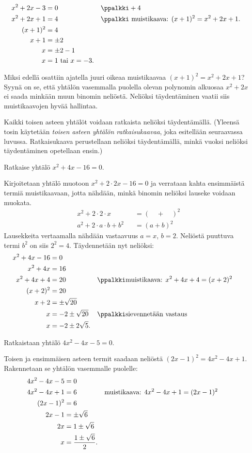 \begin{align*}
x^2+2x-3 & = 0  &&\ppalkki +4 \\
x^2+2x+1 & = 4  &&\ppalkki \text{ muistikaava: } (x+1)^2=x^2+2x+1. \\
(x+1)^2 & = 4 \\
x+1 & = \pm 2 \\
x & = \pm 2 - 1 \\
x & = 1 \text{ tai } x= -3. 
\end{align*}

Miksi edellä osattiin ajatella juuri oikeaa muistikaavaa $(x+1)^2=x^2+2x+1$?
Syynä on se, että yhtälön vasemmalla
puolella olevan polynomin alkuosaa $x^2+2x$ ei saada minkään muun
binomin neliöstä. Neliöksi täydentäminen vaatii siis muistikaavojen hyvää
hallintaa.

Kaikki toisen asteen yhtälöt voidaan ratkaista neliöksi täydentämällä. (Yleensä tosin käytetään \emph{toisen asteen yhtälön ratkaisukaavaa}, joka esitellään seuraavassa luvussa. Ratkaisukaava perustellaan neliöksi täydentämällä, minkä vuoksi neliöksi täydentäminen opetellaan ensin.)

\begin{esimerkki} Ratkaise yhtälö $x^2+4x-16 = 0$. 

Kirjoitetaan yhtälö muotoon $x^2+2\cdot 2x-16 = 0$ ja verrataan kahta ensimmäistä termiä
muistikaavaan, jotta nähdään, minkä binomin neliöksi lauseke voidaan muokata.
\begin{align*}
&x^2+2\cdot 2\cdot x  &&= (\quad + \quad)^2\\
&a^2 +2\cdot a\cdot b +b^2 &&= (a+b)^2
\end{align*}
Lausekkeita vertaamalla nähdään vastaavuus $a = x$, $b = 2$. Neliöstä puuttuva
termi $b^2$ on siis $2^2=4$. Täydennetään nyt neliöksi:
\begin{align*}
x^2+4x-16 &= 0 \\
x^2+4x &= 16 && \\
x^2+4x+4 &= 20 && \ppalkki \text{muistikaava: $ x^2+4x+4= (x+2)^2$} \\
(x+2)^2 &= 20 \\
x+2 &= \pm \sqrt{20} \\
x &= -2 \pm \sqrt{20} && \ppalkki \text{sievennetään vastaus} \\
x &= -2 \pm 2\sqrt{5}.
\end{align*}
\end{esimerkki}

\begin{esimerkki}
Ratkaistaan yhtälö $4x^2-4x-5=0$.

Toisen ja ensimmäisen asteen termit saadaan neliöstä
$(2x-1)^2=4x^2-4x+1$. Rakennetaan se yhtälön vasemmalle puolelle:
\begin{align*}
4x^2-4x-5 &= 0 \\
4x^2-4x+1 &= 6 &&\text{muistikaava: $  4x^2-4x+1 = (2x-1)^2$} \\
(2x-1)^2 &= 6 \\
2x-1 &= \pm \sqrt{6} \\
2x &= 1 \pm \sqrt{6} \\
x &= \frac{1 \pm \sqrt{6}}{2}.
\end{align*}
\end{esimerkki}

